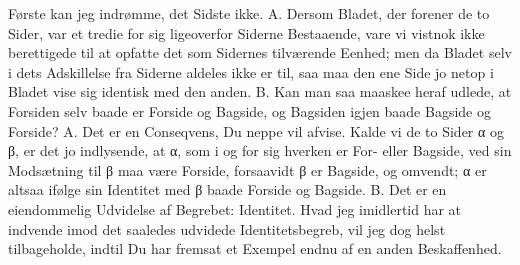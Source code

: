 \documentclass[12pt,a4paper]{book}
\begin{document}
Første kan jeg indrømme, det Sidste ikke. A. Dersom Bladet, der
forener de to Sider, var et tredie for sig ligeoverfor Siderne
Bestaaende, vare vi vistnok ikke berettigede til at opfatte det som
Sidernes tilværende Eenhed; men da Bladet selv i dets Adskillelse fra
Siderne aldeles ikke er til, saa maa den ene Side jo netop i Bladet vise
sig identisk med den anden. B. Kan man saa maaskee heraf udlede, at
Forsiden selv baade er Forside og Bagside, og Bagsiden igjen baade
Bagside og Forside? A. Det er en Conseqvens, Du neppe vil afvise.
Kalde vi de to Sider α og β, er det jo
indlysende, at α, som i og for sig hverken er For- eller Bagside, ved
sin Modsætning til β maa være Forside, forsaavidt β er Bagside, og
omvendt; α er altsaa ifølge sin Identitet med β baade Forside og
Bagside. B. Det er en eiendommelig Udvidelse af Begrebet: Identitet.
Hvad jeg imidlertid har at indvende imod det saaledes udvidede
Identitetsbegreb, vil jeg dog helst tilbageholde, indtil Du har fremsat
et Exempel endnu af en anden Beskaffenhed.
\end{document}
